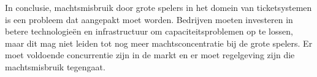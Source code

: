 In conclusie, 
machtsmisbruik door grote spelers in het domein van ticketsystemen is een probleem dat aangepakt moet worden. 
Bedrijven moeten investeren in betere technologieën en infrastructuur om capaciteitsproblemen op te lossen, 
maar dit mag niet leiden tot nog meer machtsconcentratie bij de grote spelers. 
Er moet voldoende concurrentie zijn in de markt en er moet regelgeving zijn die machtsmisbruik tegengaat.